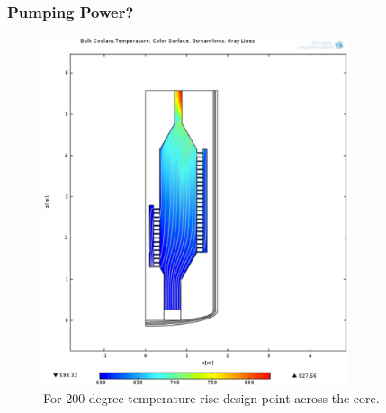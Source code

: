 \begin{frame}[fragile]
  \frametitle{Pumping Power?}

  \begin{figure}[htbp!]
    \begin{center}
      \includegraphics[width=0.8\textwidth]{./priorart/coolant_temps_200_deg_rise.eps}
    \end{center}
    \caption{For 200 degree temperature rise design point across the core.}
    \label{fig:200degrise}
  \end{figure}
\end{frame}

